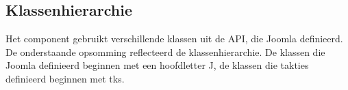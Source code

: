 \documentclass{article}
\begin{document}


\newpage
\subsection{Klassenhierarchie}

Het component gebruikt verschillende klassen uit de API, die Joomla definieerd. \\

De onderstaande opsomming reflecteerd de klassenhierarchie. De klassen die Joomla definieerd beginnen met een hoofdletter J, de klassen die takties definieerd beginnen met tks.\\
\end{document}

